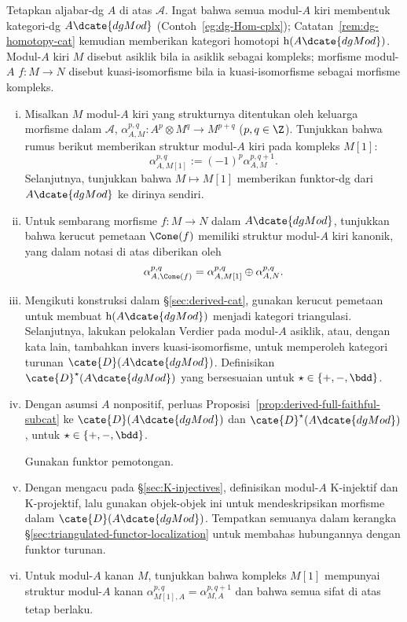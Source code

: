 \begin{Exercises}
	\item Tetapkan aljabar-dg $A$ di atas $\mathcal{A}$. Ingat bahwa semua
	modul-$A$ kiri membentuk kategori-dg $A\dcate{dgMod}$
	(Contoh~\ref{eg:dg-Hom-cplx}); Catatan~\ref{rem:dg-homotopy-cat} kemudian
	memberikan kategori homotopi $\mathrm{h}(A\dcate{dgMod})$. Modul-$A$ kiri
	$M$ disebut asiklik bila ia asiklik sebagai kompleks; morfisme modul-$A$
	$f:M\to N$ disebut kuasi-isomorfisme bila ia kuasi-isomorfisme sebagai
	morfisme kompleks.
	\begin{enumerate}[(i)]
		\item Misalkan $M$ modul-$A$ kiri yang strukturnya ditentukan oleh
		keluarga morfisme dalam $\mathcal{A}$,
		$\alpha_{A,M}^{p,q}:A^p\otimes M^q\to M^{p+q}$ ($p,q\in\Z$).
		Tunjukkan bahwa rumus berikut memberikan struktur modul-$A$ kiri pada
		kompleks $M[1]$:
		\[ \alpha_{A, M[1]}^{p, q} := (-1)^p \alpha_{A, M}^{p, q+1} . \]
		Selanjutnya, tunjukkan bahwa $M\mapsto M[1]$ memberikan funktor-dg dari
		$A\dcate{dgMod}$ ke dirinya sendiri.
		\item Untuk sembarang morfisme $f:M\to N$ dalam $A\dcate{dgMod}$,
		tunjukkan bahwa kerucut pemetaan $\Cone(f)$ memiliki struktur modul-$A$
		kiri kanonik, yang dalam notasi di atas diberikan oleh
		\[ \alpha_{A, \Cone(f)}^{p, q} = \alpha_{A, M[1]}^{p, q} \oplus \alpha_{A, N}^{p, q}. \]
		\item Mengikuti konstruksi dalam \S\ref{sec:derived-cat}, gunakan kerucut
		pemetaan untuk membuat $\mathrm{h}(A\dcate{dgMod})$ menjadi kategori
		triangulasi. Selanjutnya, lakukan pelokalan Verdier pada modul-$A$
		asiklik, atau, dengan kata lain, tambahkan invers kuasi-isomorfisme,
		untuk memperoleh kategori turunan $\cate{D}(A\dcate{dgMod})$.
		Definisikan $\cate{D}^{\star}(A\dcate{dgMod})$ yang bersesuaian untuk
		$\star\in\{+,-,\bdd\}$.
		\item Dengan asumsi $A$ nonpositif, perluas
		Proposisi~\ref{prop:derived-full-faithful-subcat} ke
		$\cate{D}(A\dcate{dgMod})$ dan
		$\cate{D}^{\star}(A\dcate{dgMod})$, untuk
		$\star\in\{+,-,\bdd\}$.
		\begin{hint}
			Gunakan funktor pemotongan.
		\end{hint}
		\item Dengan mengacu pada \S\ref{sec:K-injectives}, definisikan
		modul-$A$ K-injektif dan K-projektif, lalu gunakan objek-objek ini untuk
		mendeskripsikan morfisme dalam $\cate{D}(A\dcate{dgMod})$. Tempatkan
		semuanya dalam kerangka \S\ref{sec:triangulated-functor-localization}
		untuk membahas hubungannya dengan funktor turunan.
		\item Untuk modul-$A$ kanan $M$, tunjukkan bahwa kompleks $M[1]$
		mempunyai struktur modul-$A$ kanan
		$\alpha_{M[1],A}^{p,q}=\alpha_{M,A}^{p,q+1}$ dan bahwa semua sifat di
		atas tetap berlaku.
	\end{enumerate}


\end{Exercises}
